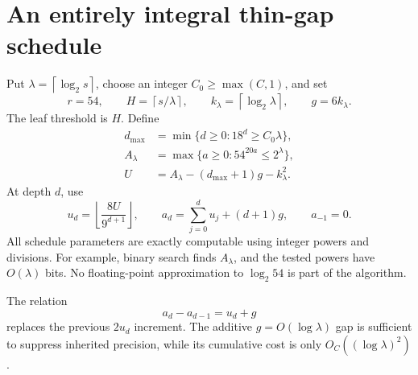 \documentclass[11pt]{article}
\theoremstyle{remark}\newtheorem{remark}[theorem]{Remark}
\newcommand{\ceil}[1]{\left\lceil #1\right\rceil}
\newcommand{\floor}[1]{\left\lfloor #1\right\rfloor}
\begin{document}
\section{An entirely integral thin-gap schedule}
\label{sec:schedule}
Put \(\lambda=\ceil{\log_2s}\), choose an integer \(C_0\ge\max(C,1)\), and set
\[
 r=54,\qquad H=\ceil{s/\lambda},\qquad
 k_\lambda=\ceil{\log_2\lambda},\qquad g=6k_\lambda.
\]
The leaf threshold is \(H\). Define
\begin{align}
 d_{\max}&=\min\{d\ge0:18^d\ge C_0\lambda\},\label{eq:dmax}\\
 A_\lambda&=\max\{a\ge0:54^{20a}\le2^\lambda\},\label{eq:budget}\\
 U&=A_\lambda-(d_{\max}+1)g-k_\lambda^2.\label{eq:U}
\end{align}
At depth \(d\), use
\begin{equation}
 u_d=\floor{\frac{8U}{9^{d+1}}},\qquad
 a_d=\sum_{j=0}^d u_j+(d+1)g,\qquad a_{-1}=0.
 \label{eq:schedule}
\end{equation}
All schedule parameters are exactly computable using integer powers and divisions. For example, binary search finds \(A_\lambda\), and the tested powers have \(O(\lambda)\) bits. No floating-point approximation to \(\log_2 54\) is part of the algorithm.

The relation
\begin{equation}
 a_d-a_{d-1}=u_d+g\label{eq:thin}
\end{equation}
replaces the previous \(2u_d\) increment. The additive \(g=O(\log\lambda)\) gap is sufficient to suppress inherited precision, while its cumulative cost is only \(O_C((\log\lambda)^2)\).
\end{document}
